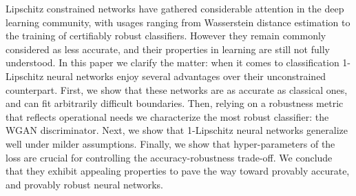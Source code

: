Lipschitz constrained networks have gathered considerable attention in the deep learning community, with usages ranging from Wasserstein distance estimation to the training of certifiably robust classifiers. However they remain commonly considered as less accurate, and their properties in learning are still not fully understood. In this paper we clarify the matter: when it comes to classification 1-Lipschitz neural networks enjoy several advantages over their unconstrained counterpart. First, we show that these networks are as accurate as classical ones, and can fit arbitrarily difficult boundaries. Then, relying on a robustness metric that reflects operational needs we characterize the most robust classifier: the WGAN discriminator. Next, we show that 1-Lipschitz neural networks generalize well under milder assumptions. Finally, we show that hyper-parameters of the loss are crucial for controlling the accuracy-robustness trade-off. We conclude that they exhibit appealing properties to pave the way toward provably accurate, and provably robust neural networks.    
